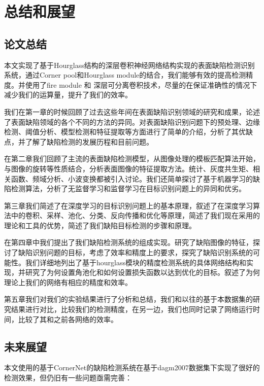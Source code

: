\chapter{总结和展望}
\section{论文总结}
本文实现了基于Hourglass结构的深层卷积神经网络结构实现的表面缺陷检测识别系统，通过Corner pool和Hourglass module的结合，我们能够有效的提高检测精度。并使用了fire module 和 深层可分离卷积技术，尽量的在保证准确性的情况下减少我们的运算量，提升了我们的效率。

我们在第一章的时候回顾了过去这些年间在表面缺陷识别领域的研究和成果，论述了表面缺陷领域的各个不同的方法的异同。对表面缺陷识别问题下的预处理、边缘检测、阈值分析、模型检测和特征提取等方面进行了简单的介绍，分析了其优缺点，并了解了缺陷检测的发展历程和目前问题。

在第二章我们回顾了主流的表面缺陷检测模型，从图像处理的模板匹配算法开始，与图像的旋转等性质结合，分析表面图像的特征提取方法。统计、灰度共生矩、相关函数、频域分析、小波变换都被引入讨论。我们还简单探讨了基于机器学习的缺陷检测算法，分析了无监督学习和监督学习在目标识别问题上的异同和优劣。

第三章我们简述了在深度学习的目标识别问题上的基本原理，叙述了在深度学习算法中的卷积、采样、池化、分类、反向传播和优化等原理，简述了我们现在采用的理论和工具的优势，简述了我们缺陷目标检测的步骤和原理。

在第四章中我们提出了我们缺陷检测系统的组成实现。研究了缺陷图像的特征，探讨了缺陷识别问题的目标，考虑了效率和精度上的要求，探究了缺陷识别系统的可能性。我们详细地列出了基于hourglass模块的精度检测系统的具体网络结构和实现，并研究了为何设置角池化和如何设置损失函数以达到优化的目标。叙述了为何理论上我们的网络有相应的精度和效率。

第五章我们对我们的实验结果进行了分析和总结，我们和以往的基于本数据集的研究结果进行对比，比较我们的检测精度，在另一边，我们也同时记录了网络运行时间，比较了其和之前各网络的效率。

\section{未来展望}

本文使用的基于CornerNet的缺陷检测系统在基于dagm2007数据集下实现了很好的检测效果，但仍旧有一些问题亟需完善：

